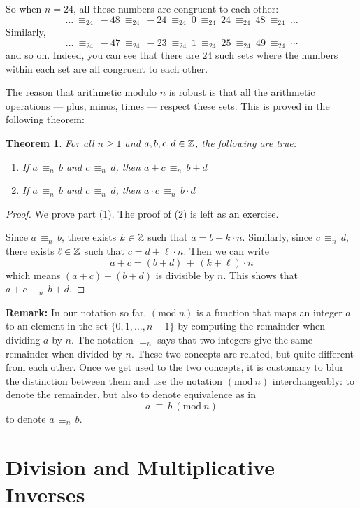 \documentclass[11pt]{article}
\newcounter{thm}
\newtheorem{theorem}{Theorem}[thm]
\renewcommand{\pmod}[1]{~(\text{mod}~#1)}
\begin{document}
So when $n = 24$, all these numbers are congruent to each other:
$$\dots ~\equiv_{24}~ -48 ~\equiv_{24}~ -24 ~\equiv_{24}~ 0 ~\equiv_{24}~ 24 ~\equiv_{24}~ 48 ~\equiv_{24}~ \dots$$
Similarly,
$$\dots ~\equiv_{24}~ -47 ~\equiv_{24}~ -23 ~\equiv_{24}~ 1 ~\equiv_{24}~ 25 ~\equiv_{24}~ 49 ~\equiv_{24}~ \cdots$$
and so on. Indeed, you can see that there are $24$ such sets where the numbers within each set are all congruent to each other.

The reason that arithmetic modulo $n$ is robust is that all the arithmetic operations --- plus, minus, times --- respect these sets. This is proved in
the following theorem:

\begin{theorem}
\label{Thm:Mod1}
For all $n \ge 1$ and $a,b,c,d \in \mathbb{Z}$, the following are true:
\begin{enumerate}
  \item If $a \,\equiv_n\, b$ and $c \,\equiv_n\, d$, then $a+c \,\equiv_n\, b+d$
  \item If $a \,\equiv_n\, b$ and $c \,\equiv_n\, d$, then $a\cdot c \,\equiv_n\, b\cdot d$
\end{enumerate}
\end {theorem}

\begin{proof}
We prove part (1). The proof of (2) is left as an exercise.

Since $a \,\equiv_n\, b$, there exists $k \in \mathbb{Z}$ such that $a = b + k \cdot n$. Similarly, since $c\,\equiv_n\, d$, there exists $\ell \in \mathbb{Z}$ such that $c = d + \ell \cdot n$. Then we can write
$$a+c = (b+d) \,+\, (k+\ell) \cdot n$$
which means $(a+c) - (b+d)$ is divisible by $n$. This shows that $a+c \,\equiv_n\, b+d$. 
\end{proof}

{\bf Remark:} In our notation so far, $(\text{mod}~n)$ is a function that maps an integer $a$ to an element in the set $\{0,1, \ldots, n-1\}$ by computing the remainder when dividing $a$ by $n$. The notation $\equiv_n$ says that two integers give the same remainder when divided by $n$. These two concepts are related, but quite different from each other. Once we get used to the two concepts, it is customary to blur the distinction between them and use the notation $(\text{mod}~n)$ interchangeably: to denote the remainder, but also to denote equivalence as in
$$a ~\equiv~ b \pmod{n}$$
to denote $a \,\equiv_n\, b$.



\section{Division and Multiplicative Inverses}
\end{document}
